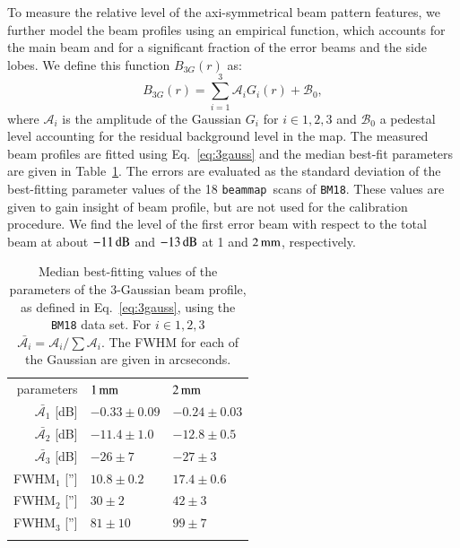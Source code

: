 \documentclass[traditionalabstract]{aa}
\newcommand{\bm}{{\tt beammap}}
\newcommand{\lp}[1]{#1}
\begin{document}
{\lp To measure the relative level of the axi-symmetrical beam pattern
features, we further model the beam profiles using an empirical function,
which accounts for the main beam and for a significant fraction of the
error beams and the side lobes. We define this function $B_{3G}(r)$ as:
\begin{equation}
  B_{3G}(r) = \sum_{i=1}^{3} \mathcal{A}_i G_i(r) + \mathcal{B}_0,
  \label{eq:3gauss}
\end{equation}
where $\mathcal{A}_i$ is the amplitude of the Gaussian $G_i$ for
$i \in {1, 2, 3}$ and $\mathcal{B}_0$ a pedestal level accounting for
the residual background level in the map. The measured beam profiles
are fitted using Eq.~\ref{eq:3gauss} and the median best-fit
parameters are given in Table~\ref{tab:mean_3gauss_fit}. The errors
are evaluated as the standard deviation of the best-fitting parameter
values of the 18 \bm\ scans of {\tt BM18}.
These values are given to gain insight of beam profile, but are not
used for the calibration procedure. We find the level of the first error
beam with respect to the total beam at about $-11\,\rm{dB}$ and
$-13\,\rm{dB}$ at 1 and $2\,\rm{mm}$, respectively.}
%
\begin{table}[!th]
   \caption{{\lp Median best-fitting values of the parameters of the
  3-Gaussian beam profile, as defined in Eq.~\ref{eq:3gauss}, using
  the {\tt BM18} data set. For $i \in {1, 2, 3}$ $\bar{\mathcal{A}_i}
  =\mathcal{A}_i / \sum{\mathcal{A}_i}$.
  The FWHM for each of the Gaussian are given in arcseconds.}}
  \label{tab:mean_3gauss_fit}
  \begin{center}
    \begin{tabular}{rll}
      \hline\hline
      \noalign{\smallskip}
       parameters  &  $1\,\rm{mm}$  & $2\,\rm{mm}$ \\
       \noalign{\smallskip} 
      \hline
      \noalign{\smallskip} 
      $\bar{\mathcal{A}_1}$ [dB] &   $-0.33 \pm 0.09$   &  $-0.24 \pm 0.03$ \\
      $\bar{\mathcal{A}_2}$ [dB] &   $-11.4 \pm 1.0$     &  $-12.8 \pm 0.5$   \\
      $\bar{\mathcal{A}_3}$ [dB] &   $-26 \pm 7$       &  $-27 \pm 3$    \\
      FWHM$_1$  ['']             &   $10.8 \pm 0.2$    &  $17.4 \pm 0.6 $ \\
      FWHM$_2$  ['']             &   $30 \pm 2$        &  $42 \pm 3 $ \\
      FWHM$_3$  ['']             &   $81 \pm 10$       &  $99 \pm 7 $ \\     
       \noalign{\smallskip}   
      \hline
    \end{tabular}    
  \end{center}
\end{table}
%
\end{document}
